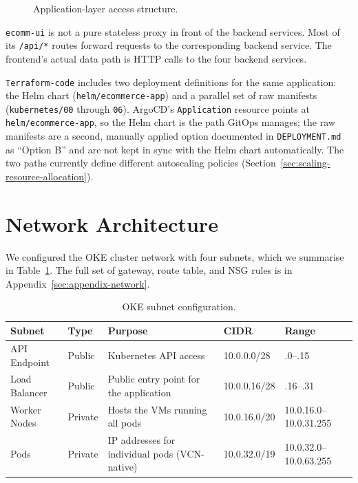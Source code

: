 \begin{figure}[H]
{
}
\caption{Application-layer access structure.}
\label{fig:app-access}
\end{figure}

\begin{infobox}[Note]
\texttt{ecomm-ui} is not a pure stateless proxy in front of the backend services.
Most of its \texttt{/api/*} routes forward requests to the corresponding backend
service. The frontend's actual data path is HTTP calls to the four backend
services.
\end{infobox}

\texttt{Terraform-code} includes two deployment definitions for the same
application: the Helm chart (\texttt{helm/ecommerce-app}) and a parallel set of raw
manifests (\texttt{kubernetes/00} through \texttt{06}). ArgoCD's
\texttt{Application} resource points at \texttt{helm/ecommerce-app}, so the Helm
chart is the path GitOps manages; the raw manifests are a second, manually applied
option documented in \texttt{DEPLOYMENT.md} as ``Option B'' and are not kept in sync
with the Helm chart automatically. The two paths currently define different
autoscaling policies (Section~\ref{sec:scaling-resource-allocation}).

\section{Network Architecture}\label{sec:domain-context}
We configured the OKE cluster network with four subnets, which we summarise in
Table~\ref{tab:subnet-design}. The full set of gateway, route table, and NSG rules
is in Appendix~\ref{sec:appendix-network}.

\begin{table}[H]
\centering
\caption{OKE subnet configuration.}
\label{tab:subnet-design}
\small
\begin{tabularx}{\textwidth}{>{\raggedright\arraybackslash}p{2.4cm} l
                >{\raggedright\arraybackslash}X l l}
\toprule
\textbf{Subnet} & \textbf{Type} & \textbf{Purpose} & \textbf{CIDR} & \textbf{Range} \\
\midrule
API Endpoint & Public & Kubernetes API access & 10.0.0.0/28 & .0--.15 \\
Load Balancer & Public & Public entry point for the application & 10.0.0.16/28 & .16--.31 \\
Worker Nodes & Private & Hosts the VMs running all pods & 10.0.16.0/20 & 10.0.16.0--10.0.31.255 \\
Pods & Private & IP addresses for individual pods (VCN-native) & 10.0.32.0/19 & 10.0.32.0--10.0.63.255 \\
\bottomrule
\end{tabularx}
\end{table}

